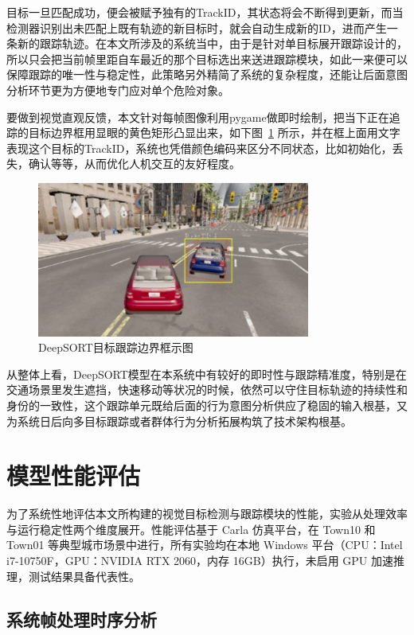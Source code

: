 目标一旦匹配成功，便会被赋予独有的TrackID，其状态将会不断得到更新，而当检测器识别出未匹配上既有轨迹的新目标时，就会自动生成新的ID，进而产生一条新的跟踪轨迹。在本文所涉及的系统当中，由于是针对单目标展开跟踪设计的，所以只会把当前帧里距自车最近的那个目标选出来送进跟踪模块，如此一来便可以保障跟踪的唯一性与稳定性，此策略另外精简了系统的复杂程度，还能让后面意图分析环节更为方便地专门应对单个危险对象。

要做到视觉直观反馈，本文针对每帧图像利用pygame做即时绘制，把当下正在追踪的目标边界框用显眼的黄色矩形凸显出来，如下图~\ref{fig:DeepSORT} 所示，并在框上面用文字表现这个目标的TrackID，系统也凭借颜色编码来区分不同状态，比如初始化，丢失，确认等等，从而优化人机交互的友好程度。

\begin{figure}[H]
    \centering
    \includegraphics[width=0.8\textwidth]{images/图10 DeepSORT目标跟踪边界框示图.pdf}  %
    \caption{DeepSORT目标跟踪边界框示图}
    \label{fig:DeepSORT}  %
\end{figure}

从整体上看，DeepSORT模型在本系统中有较好的即时性与跟踪精准度，特别是在交通场景里发生遮挡，快速移动等状况的时候，依然可以守住目标轨迹的持续性和身份的一致性，这个跟踪单元既给后面的行为意图分析供应了稳固的输入根基，又为系统日后向多目标跟踪或者群体行为分析拓展构筑了技术架构根基。

\section{模型性能评估}

为了系统性地评估本文所构建的视觉目标检测与跟踪模块的性能，实验从处理效率与运行稳定性两个维度展开。性能评估基于 Carla 仿真平台，在 Town10 和 Town01 等典型城市场景中进行，所有实验均在本地 Windows 平台（CPU：Intel i7-10750F，GPU：NVIDIA RTX 2060，内存 16GB）执行，未启用 GPU 加速推理，测试结果具备代表性。

\subsection{系统帧处理时序分析}


